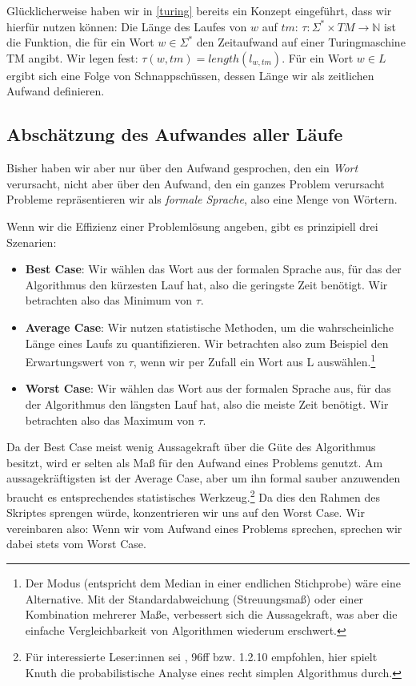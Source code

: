 Glücklicherweise haben wir in \autoref{turing} bereits ein Konzept eingeführt,
dass wir hierfür nutzen können:
Die Länge des Laufes von $w$ auf $tm$:
$\tau: \Sigma^* \times TM \rightarrow \mathbb{N}$ ist die Funktion,
die für ein Wort $w \in \Sigma^*$ den Zeitaufwand auf einer Turingmaschine TM angibt.
Wir legen fest: $\tau(w,tm) =  length(l_{w,tm})$.
Für ein Wort $w \in L$ ergibt sich eine Folge von Schnappschüssen,
dessen Länge wir als zeitlichen Aufwand definieren.



\subsection{Abschätzung des Aufwandes aller Läufe}

Bisher haben wir aber nur über den Aufwand gesprochen,
den ein \emph{Wort} verursacht,
nicht aber über den Aufwand,
den ein ganzes Problem verursacht
Probleme repräsentieren wir als \emph{formale Sprache},
also eine Menge von Wörtern.

Wenn wir die Effizienz einer Problemlösung angeben,
gibt es prinzipiell drei Szenarien:
\begin{itemize}
    \item \textbf{Best Case}: Wir wählen das Wort aus der formalen Sprache aus,
        für das der Algorithmus den kürzesten Lauf hat,
        also die geringste Zeit benötigt.
        Wir betrachten also das Minimum von $\tau$.
    \item \textbf{Average Case}: Wir nutzen statistische Methoden,
        um die wahrscheinliche Länge eines Laufs zu quantifizieren.
        Wir betrachten also zum Beispiel den Erwartungswert von $\tau$,
        wenn wir per Zufall ein Wort aus L auswählen.\footnote{
            Der Modus (entspricht dem Median in einer endlichen Stichprobe) wäre eine Alternative.
        Mit der Standardabweichung (Streuungsmaß) oder einer Kombination mehrerer Maße,
        verbessert sich die Aussagekraft,
        was aber die einfache Vergleichbarkeit von Algorithmen wiederum erschwert.}
    \item \textbf{Worst Case}: Wir wählen das Wort aus der formalen Sprache aus,
        für das der Algorithmus den längsten Lauf hat,
        also die meiste Zeit benötigt.
        Wir betrachten also das Maximum von $\tau$. 
\end{itemize} 

Da der Best Case meist wenig Aussagekraft über die Güte des Algorithmus besitzt,
wird er selten als Maß für den Aufwand eines Problems genutzt.
Am aussagekräftigsten ist der Average Case,
aber um ihn formal sauber anzuwenden braucht es
entsprechendes statistisches Werkzeug.\footnote{
    Für interessierte Leser:innen sei \cite{knuth1}, 96ff bzw. 1.2.10 empfohlen,
    hier spielt Knuth die probabilistische Analyse eines recht simplen Algorithmus durch.} 
Da dies den Rahmen des Skriptes sprengen würde,
konzentrieren wir uns auf den Worst Case.
Wir vereinbaren also: Wenn wir vom Aufwand eines Problems sprechen,
sprechen wir dabei stets vom Worst Case.

